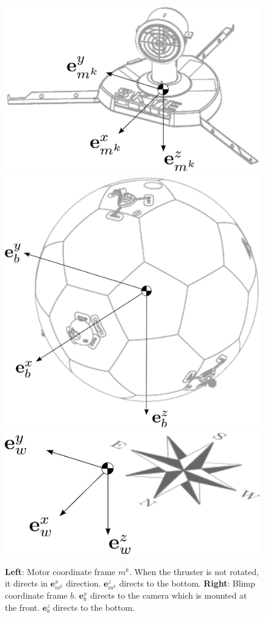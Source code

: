\begin{figure}[hbtp]
\centering
\includegraphics[scale=.4]{images/intro/motor_frame.eps}
\includegraphics[scale=.4]{images/intro/blimp_frame.eps} \\
\includegraphics[scale=.4]{images/intro/world_frame.eps}
\caption{\textbf{Left}: Motor coordinate frame $m^k$. When the thruster is not rotated, it directs in $\mathbf{e}^x_{m^k}$ direction. $\mathbf{e}^z_{m^k}$ directs to the bottom.
\textbf{Right}: Blimp coordinate frame $b$. $\mathbf{e}^x_{b}$ directs to the camera which is mounted at the front. 
$\mathbf{e}^z_{b}$ directs to the bottom.}
\label{fig:frames}
\end{figure}

